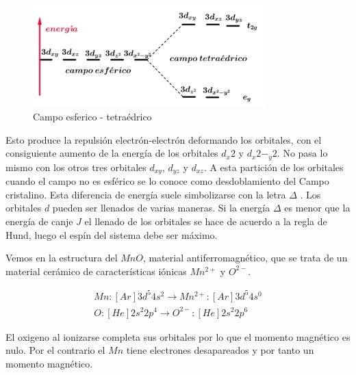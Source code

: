 \begin{figure}[H]
    \centering
    \includegraphics[width=0.8\textwidth]{./Figures/campoEsferico2}
	\caption{Campo esferico - tetraédrico}
	\label{fig:campoEsferico2}
\end{figure}

Esto produce la repulsión electrón-electrón deformando los orbitales, con el consiguiente aumento de la energía de los orbitales $d_{x}2$ y $d_{x}2-_{y}2$. No pasa lo mismo con los otros tres orbitales $d_{xy}$, $d_{yz}$ y $d_{xz}$. A esta partición de los orbitales cuando el campo no es esférico se lo conoce como desdoblamiento del Campo cristalino. Esta diferencia de energía suele simbolizarse con la letra $\Delta$ . Los orbitales $d$ pueden ser llenados de varias maneras. Si la energía $\Delta$ es menor que la energía de canje $J$ el llenado de los orbitales se hace de acuerdo a la regla de Hund, luego el espín del sistema debe ser máximo.


Vemos en la estructura del $MnO$, material antiferromagnético, que se trata de un material cerámico de características iónicas $Mn^{2+}$ y $O^{2-}$.

\begin{equation}
\begin{aligned}
	Mn: [Ar]3d^{5}4s^{2}\rightarrow Mn^{2+}: [Ar]3d^{5}4s^{0}  \\
	O: [He]2s^{2}2p^{4}\rightarrow O^{2-}: [He]2s^{2}2p^{6}
\end{aligned}
\end{equation}

El oxigeno al ionizarse completa sus orbitales por lo que el momento magnético es nulo. Por el contrario el $Mn$ tiene electrones desapareados y por tanto un momento magnético.

